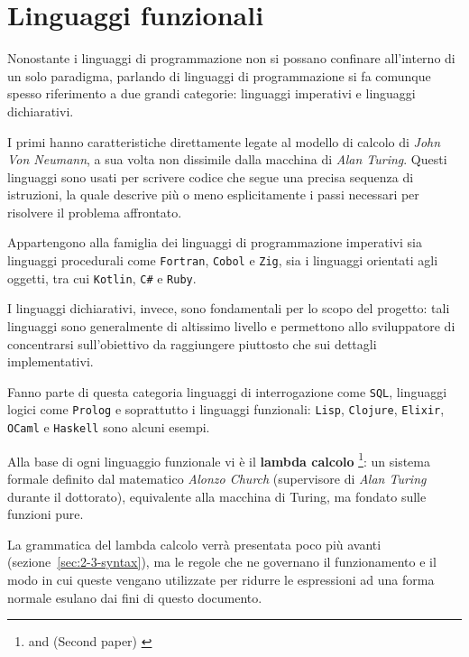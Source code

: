 \section{Linguaggi funzionali}
\label{sec:2-1-functional-languages}

Nonostante i linguaggi di programmazione non si possano confinare all'interno di un solo paradigma,
parlando di linguaggi di programmazione si fa comunque spesso riferimento a due grandi categorie:
linguaggi imperativi e linguaggi dichiarativi.


I primi hanno caratteristiche direttamente legate al modello di calcolo di \textit{John Von Neumann},
a sua volta non dissimile dalla macchina di \textit{Alan Turing}.
Questi linguaggi sono usati per scrivere codice che segue una precisa sequenza di istruzioni,
la quale descrive più o meno esplicitamente i passi necessari per risolvere il problema affrontato.

\noindent Appartengono alla famiglia dei linguaggi di programmazione imperativi sia linguaggi procedurali come
\texttt{Fortran}, \texttt{Cobol} e \texttt{Zig}, sia i linguaggi orientati agli oggetti, tra cui \texttt{Kotlin}, \texttt{C\#} e \texttt{Ruby}.


I linguaggi dichiarativi, invece, sono fondamentali per lo scopo del progetto:
tali linguaggi sono generalmente di altissimo livello e permettono allo sviluppatore
di concentrarsi sull'obiettivo da raggiungere piuttosto che sui dettagli implementativi.

\noindent Fanno parte di questa categoria linguaggi di interrogazione come \texttt{SQL},
linguaggi logici come \texttt{Prolog} e soprattutto i linguaggi funzionali:
\texttt{Lisp}, \texttt{Clojure}, \texttt{Elixir}, \texttt{OCaml} e \texttt{Haskell} sono alcuni esempi.


Alla base di ogni linguaggio funzionale vi è il \textbf{lambda calcolo}%
\footnote{ \cite{Church-1932-FoundationLogic}
      and  (Second paper) \cite{Church-1933-FoundationLogic}}:
un sistema formale definito dal matematico \textit{Alonzo Church} (supervisore di \textit{Alan Turing} durante il dottorato),
equivalente alla macchina di Turing, ma fondato sulle funzioni pure.

\newpage

\noindent La grammatica del lambda calcolo verrà presentata poco più avanti (sezione~\ref{sec:2-3-syntax}),
ma le regole che ne governano il funzionamento e il modo in cui queste vengano utilizzate per ridurre
le espressioni ad una forma normale esulano dai fini di questo documento.

